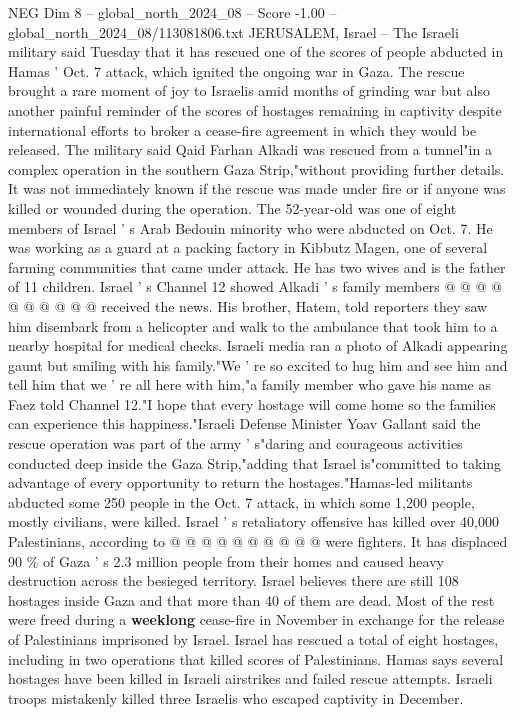 \begin{textsample}{NEG Dim 8 – global\_north\_2024\_08 – Score -1.00 – global\_north\_2024\_08/113081806.txt}  \label{ex:f8_neg_123}
JERUSALEM, Israel -- The Israeli military said Tuesday that it has rescued one of the scores of people abducted in Hamas ' Oct. 7 attack, which ignited the ongoing war in Gaza.
The rescue brought a rare moment of joy to Israelis amid months of grinding war but also another painful reminder of the scores of hostages remaining in captivity despite international efforts to broker a cease-fire agreement in which they would be released.
The military said Qaid Farhan Alkadi was rescued from a tunnel"in a complex operation in the southern Gaza Strip,"without providing further details.
It was not immediately known if the rescue was made under fire or if anyone was killed or wounded during the operation.
The 52-year-old was one of eight members of Israel ' s Arab Bedouin minority who were abducted on Oct. 7.
He was working as a guard at a packing factory in Kibbutz Magen, one of several farming communities that came under attack.
He has two wives and is the father of 11 children.
Israel ' s Channel 12 showed Alkadi ' s family members @ @ @ @ @ @ @ @ @ @ received the news.
His brother, Hatem, told reporters they saw him disembark from a helicopter and walk to the ambulance that took him to a nearby hospital for medical checks.
Israeli media ran a photo of Alkadi appearing gaunt but smiling with his family."We ' re so excited to hug him and see him and tell him that we ' re all here with him,"a family member who gave his name as Faez told Channel 12."I hope that every hostage will come home so the families can experience this happiness."Israeli Defense Minister Yoav Gallant said the rescue operation was part of the army ' s"daring and courageous activities conducted deep inside the Gaza Strip,"adding that Israel is"committed to taking advantage of every opportunity to return the hostages."Hamas-led militants abducted some 250 people in the Oct. 7 attack, in which some 1,200 people, mostly civilians, were killed.
Israel ' s retaliatory offensive has killed over 40,000 Palestinians, according to @ @ @ @ @ @ @ @ @ @ were fighters.
It has displaced 90 \% of Gaza ' s 2.3 million people from their homes and caused heavy destruction across the besieged territory.
Israel believes there are still 108 hostages inside Gaza and that more than 40 of them are dead.
Most of the rest were freed during a \textbf{weeklong} cease-fire in November in exchange for the release of Palestinians imprisoned by Israel.
Israel has rescued a total of eight hostages, including in two operations that killed scores of Palestinians.
Hamas says several hostages have been killed in Israeli airstrikes and failed rescue attempts.
Israeli troops mistakenly killed three Israelis who escaped captivity in December.

\end{textsample}
